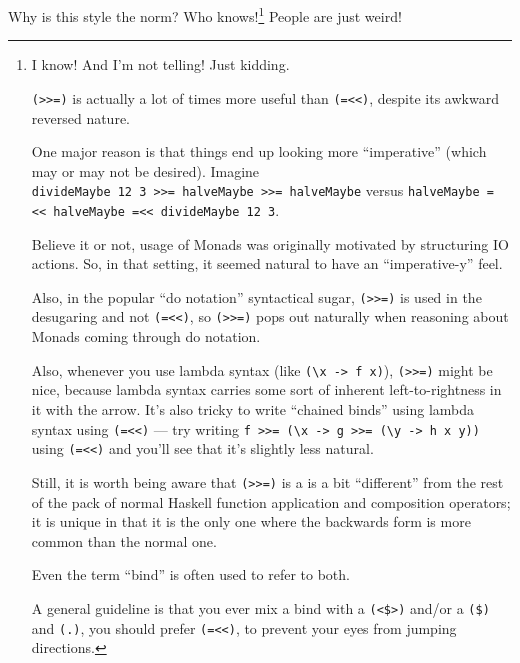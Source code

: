 \documentclass[]{article}
\begin{document}
Why is this style the norm? Who knows!\footnote{I know! And I'm not
  telling! Just kidding.

  \texttt{(\textgreater{}\textgreater{}=)} is actually a lot of times
  more useful than \texttt{(=\textless{}\textless{})}, despite its
  awkward reversed nature.

  One major reason is that things end up looking more ``imperative''
  (which may or may not be desired). Imagine
  \texttt{divideMaybe\ 12\ 3\ \textgreater{}\textgreater{}=\ halveMaybe\ \textgreater{}\textgreater{}=\ halveMaybe}
  versus
  \texttt{halveMaybe\ =\textless{}\textless{}\ halveMaybe\ =\textless{}\textless{}\ divideMaybe\ 12\ 3}.

  Believe it or not, usage of Monads was originally motivated by
  structuring IO actions. So, in that setting, it seemed natural to have
  an ``imperative-y'' feel.

  Also, in the popular ``do notation'' syntactical sugar,
  \texttt{(\textgreater{}\textgreater{}=)} is used in the desugaring and
  not \texttt{(=\textless{}\textless{})}, so
  \texttt{(\textgreater{}\textgreater{}=)} pops out naturally when
  reasoning about Monads coming through do notation.

  Also, whenever you use lambda syntax (like
  \texttt{(\textbackslash{}x\ -\textgreater{}\ f\ x)}),
  \texttt{(\textgreater{}\textgreater{}=)} might be nice, because lambda
  syntax carries some sort of inherent left-to-rightness in it with the
  arrow. It's also tricky to write ``chained binds'' using lambda syntax
  using \texttt{(=\textless{}\textless{})} --- try writing
  \texttt{f\ \textgreater{}\textgreater{}=\ (\textbackslash{}x\ -\textgreater{}\ g\ \textgreater{}\textgreater{}=\ (\textbackslash{}y\ -\textgreater{}\ h\ x\ y))}
  using \texttt{(=\textless{}\textless{})} and you'll see that it's
  slightly less natural.

  Still, it is worth being aware that
  \texttt{(\textgreater{}\textgreater{}=)} is a is a bit ``different''
  from the rest of the pack of normal Haskell function application and
  composition operators; it is unique in that it is the only one where
  the backwards form is more common than the normal one.

  Even the term ``bind'' is often used to refer to both.

  A general guideline is that you ever mix a bind with a
  \texttt{(\textless{}\$\textgreater{})} and/or a \texttt{(\$)} and
  \texttt{(.)}, you should prefer \texttt{(=\textless{}\textless{})}, to
  prevent your eyes from jumping directions.} People are just weird!
\end{document}
